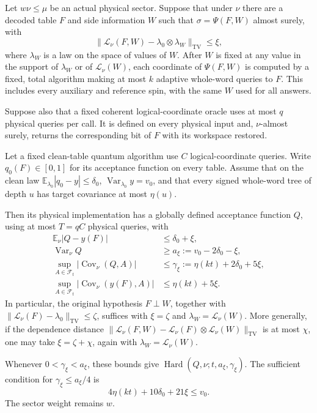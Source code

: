 \begin{theorem}
\label{ian:thermal-robust-compilation}
Let \(w\nu\le\mu\) be an actual physical sector. Suppose that under
\(\nu\) there are a decoded table \(F\) and side information \(W\)
such that \(\sigma=\Psi(F,W)\) almost surely, with
\[
 \bigl\|\mathcal L_\nu(F,W)
       -\lambda_0\otimes\lambda_W\bigr\|_{\mathrm{TV}}\le\xi ,
 \tag{38.3}
\]
where \(\lambda_W\) is a law on the space of values of \(W\).
After \(W\) is fixed at any value in the support of \(\lambda_W\) or
of \(\mathcal L_\nu(W)\), each coordinate of \(\Psi(F,W)\) is computed
by a fixed, total algorithm making at most \(k\) adaptive whole-word
queries to \(F\). This includes every auxiliary and reference spin,
with the same \(W\) used for all answers.

Suppose also that a fixed coherent logical-coordinate oracle uses
at most \(q\) physical queries per call. It is defined on every
physical input and, \(\nu\)-almost surely, returns the corresponding
bit of \(F\) with its workspace restored.

Let a fixed clean-table quantum algorithm use \(C\) logical-coordinate
queries. Write \(q_0(F)\in[0,1]\) for its acceptance function on every
table. Assume that on the clean law
\(\mathbb E_{\lambda_0}|q_0-y|\le\delta_0\),
\(\operatorname{Var}_{\lambda_0}y=v_0\), and that every signed
whole-word tree of depth \(u\) has target covariance at most
\(\eta(u)\).

Then its physical implementation has a globally defined acceptance
function \(Q\), using at most \(T=qC\) physical queries, with
\[
 \begin{aligned}
 \mathbb E_\nu|Q-y(F)|&\le\delta_0+\xi,\\
 \operatorname{Var}_\nu Q&\ge
       a_\xi:=v_0-2\delta_0-\xi,\\
 \sup_{A\in\mathcal F_t}
       |\operatorname{Cov}_\nu(Q,A)|
       &\le\gamma_\xi:=
          \eta(kt)+2\delta_0+5\xi,\\
 \sup_{A\in\mathcal F_t}
       |\operatorname{Cov}_\nu(y(F),A)|
       &\le\eta(kt)+5\xi .
 \end{aligned}
 \tag{38.4}\label{ian:thermal-robust-compilation-bounds}
\]
In particular, the original hypothesis
\(F\perp W\), together with
\(\|\mathcal L_\nu(F)-\lambda_0\|_{\mathrm{TV}}\le\zeta\),
suffices with \(\xi=\zeta\) and \(\lambda_W=\mathcal L_\nu(W)\).
More generally, if the dependence distance
\(\|\mathcal L_\nu(F,W)
-\mathcal L_\nu(F)\otimes\mathcal L_\nu(W)\|_{\mathrm{TV}}\)
is at most \(\chi\), one may take \(\xi=\zeta+\chi\), again with
\(\lambda_W=\mathcal L_\nu(W)\).

Whenever \(0<\gamma_\xi<a_\xi\), these bounds give
\(\operatorname{Hard}(Q,\nu;t,a_\xi,\gamma_\xi)\).
The sufficient condition for \(\gamma_\xi\le a_\xi/4\) is
\[
 4\eta(kt)+10\delta_0+21\xi\le v_0 .
 \tag{38.5}\label{ian:thermal-robust-sufficient-condition}
\]
The sector weight remains \(w\).
\end{theorem}

